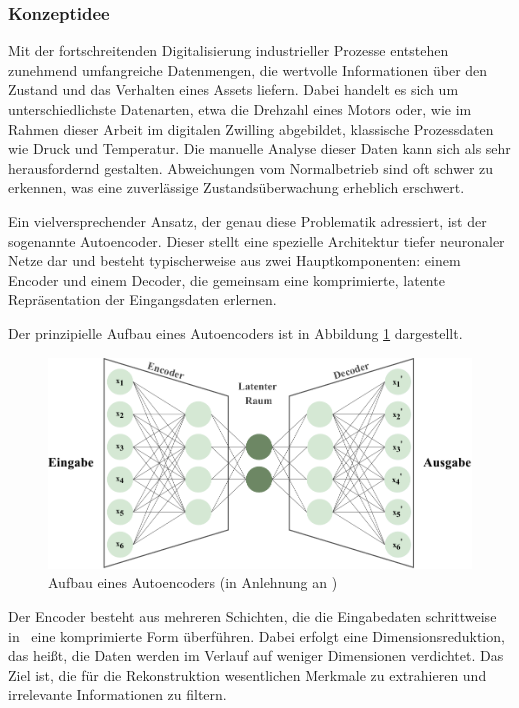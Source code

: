 \subsubsection{Konzeptidee}
Mit der fortschreitenden Digitalisierung industrieller Prozesse entstehen zunehmend umfangreiche Datenmengen, die wertvolle Informationen über den Zustand und das Verhalten eines Assets liefern. 
Dabei handelt es sich um unterschiedlichste Datenarten, etwa die Drehzahl eines Motors oder, wie im Rahmen dieser Arbeit im digitalen Zwilling abgebildet, klassische Prozessdaten wie Druck und Temperatur.
Die manuelle Analyse dieser Daten kann sich als sehr herausfordernd gestalten. Abweichungen vom Normalbetrieb sind oft schwer zu erkennen, was eine zuverlässige Zustandsüberwachung erheblich erschwert.

Ein vielversprechender Ansatz, der genau diese Problematik adressiert, ist der sogenannte Autoencoder. 
Dieser stellt eine spezielle Architektur tiefer neuronaler Netze dar und besteht typischerweise aus zwei Hauptkomponenten: einem Encoder und einem Decoder, die gemeinsam eine komprimierte, latente Repräsentation der Eingangsdaten erlernen.
\cite{Lempitsky2019}

Der prinzipielle Aufbau eines Autoencoders ist in Abbildung \ref{fig:Autoencoder} dargestellt.

\begin{figure}[htbp]
    \centering
    \includegraphics[width=1\textwidth]{Bilder/Autoencoder/AutoencoderModell.pdf}
    \caption[Aufbau eines Autoencoders]{Aufbau eines Autoencoders (in Anlehnung an \cite{AutoencoderBild})}
    \label{fig:Autoencoder}
\end{figure}

\vspace{-0.75em}
Der Encoder besteht aus mehreren Schichten, die die Eingabedaten schrittweise in%
\pagebreak
~eine komprimierte Form überführen. 
Dabei erfolgt eine Dimensionsreduktion, das heißt, die Daten werden im Verlauf auf weniger Dimensionen verdichtet. 
Das Ziel ist, die für die Rekonstruktion wesentlichen Merkmale zu extrahieren und irrelevante Informationen zu filtern.

